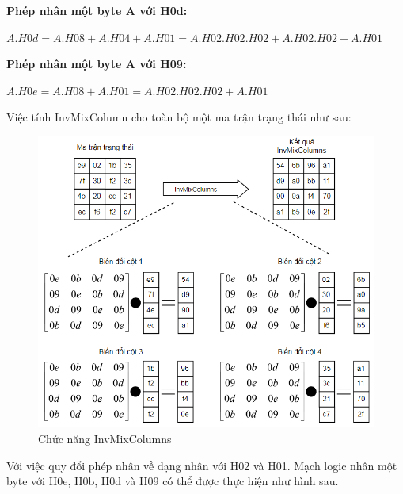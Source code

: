 \begin{itemize}
\textbf{Phép nhân một byte A với H0d:}
\begin{center}
    $A.H0d = A.H08 + A.H04 + A.H01 = A.H02.H02.H02 + A.H02.H02 + A.H01 $
\end{center}

\textbf{Phép nhân một byte A với H09:}
\begin{center}
    $A.H0e = A.H08 + A.H01 = A.H02.H02.H02 + A.H01$
\end{center}

Việc tính InvMixColumn cho toàn bộ một ma trận trạng thái như sau:

\begin{figure}[H]
    \centering
    \includegraphics[scale=0.5]{pic/huê/Chức năng InvMixColumns.png}
    
    \caption{Chức năng InvMixColumns}
\end{figure}

Với việc quy đổi phép nhân về dạng nhân với H02 và H01. Mạch logic nhân một byte với H0e, H0b, H0d và H09 có thể được thực hiện như hình sau.


\end{itemize}
